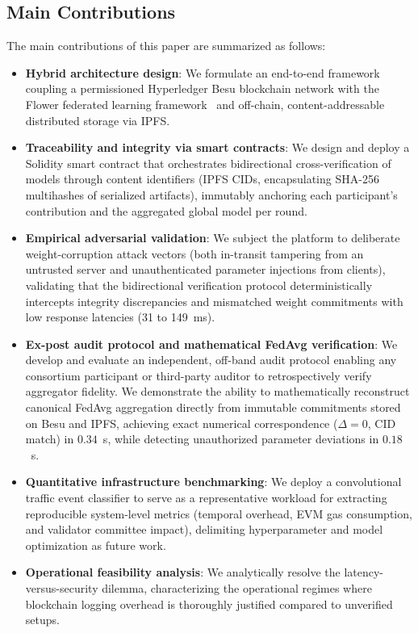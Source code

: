 \subsection{Main Contributions}
The main contributions of this paper are summarized as follows:
\begin{itemize}
    \item \textbf{Hybrid architecture design}: We formulate an end-to-end framework coupling a permissioned Hyperledger Besu blockchain network with the Flower federated learning framework~\cite{beutel2020flower} and off-chain, content-addressable distributed storage via IPFS.
    \item \textbf{Traceability and integrity via smart contracts}: We design and deploy a Solidity smart contract that orchestrates bidirectional cross-verification of models through content identifiers (IPFS CIDs, encapsulating SHA-256 multihashes of serialized artifacts), immutably anchoring each participant's contribution and the aggregated global model per round.
    \item \textbf{Empirical adversarial validation}: We subject the platform to deliberate weight-corruption attack vectors (both in-transit tampering from an untrusted server and unauthenticated parameter injections from clients), validating that the bidirectional verification protocol deterministically intercepts integrity discrepancies and mismatched weight commitments with low response latencies (31 to 149~ms).
    \item \textbf{Ex-post audit protocol and mathematical FedAvg verification}: We develop and evaluate an independent, off-band audit protocol enabling any consortium participant or third-party auditor to retrospectively verify aggregator fidelity. We demonstrate the ability to mathematically reconstruct canonical FedAvg aggregation directly from immutable commitments stored on Besu and IPFS, achieving exact numerical correspondence ($\Delta = 0$, CID match) in $0.34$~s, while detecting unauthorized parameter deviations in $0.18$~s.
    \item \textbf{Quantitative infrastructure benchmarking}: We deploy a convolutional traffic event classifier to serve as a representative workload for extracting reproducible system-level metrics (temporal overhead, EVM gas consumption, and validator committee impact), delimiting hyperparameter and model optimization as future work.
    \item \textbf{Operational feasibility analysis}: We analytically resolve the latency-versus-security dilemma, characterizing the operational regimes where blockchain logging overhead is thoroughly justified compared to unverified setups.
\end{itemize}

